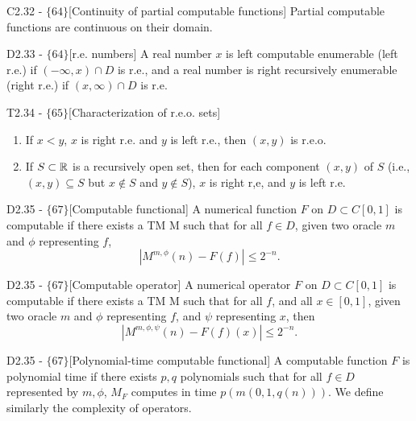 \documentclass{article}
\begin{document}
\begin{flexilemma}{C2.32 - $\{64\}$}[Continuity of partial computable functions]
    Partial computable functions are continuous on their domain.
\end{flexilemma}

\begin{flexidefinition}{D2.33 - $\{64\}$}[r.e. numbers]
    A real number $x$ is left computable enumerable (left r.e.) if $(- \infty, x) \cap D$ is r.e., and a real number is right recursively enumerable (right r.e.) if $(x,\infty) \cap D$ is r.e.
\end{flexidefinition}

\begin{flexitheorem}{T2.34 - $\{65\}$}[Characterization of r.e.o. sets]
    \begin{enumerate}[label=(\alph*)]
        \item If $x < y$, $x$ is right r.e. and $y$ is left r.e., then $(x,y)$ is r.e.o.
        \item If $S \subset \mathbb{R}$ is a recursively open set, then for each component $(x,y)$ of $S$ (i.e., $(x,y) \subseteq S$ but $x \notin S$ and $y \notin S$), $x$ is right r,e, and $y$ is left r.e.
    \end{enumerate}
\end{flexitheorem}

\begin{flexidefinition}{D2.35 - $\{67\}$}[Computable functional]
    A numerical function $F$ on $ D \subset C[0,1]$ is computable if there exists a TM M such that for all $f \in D$, given two oracle $m$ and $\phi$ representing $f$,
    \begin{equation}
        |M^{m,\phi}(n) - F(f)| \leq 2^{-n}.
    \end{equation}
\end{flexidefinition}

\begin{flexidefinition}{D2.35 - $\{67\}$}[Computable operator]
    A numerical operator $F$ on $ D \subset C[0,1]$ is computable if there exists a TM M such that for all $f$, and all $x \in [0,1]$, given two oracle $m$ and $\phi$ representing $f$, and $\psi$ representing $x$, then
    \begin{equation}
        |M^{m,\phi,\psi}(n) - F(f)(x)| \leq 2^{-n}.
    \end{equation}
\end{flexidefinition}

\begin{flexidefinition}{D2.35 - $\{67\}$}[Polynomial-time computable functional]
    A computable function $F$ is polynomial time if there exists $p,q$ polynomials such that for all $f \in D$ represented by $m,\phi$, $M_F$ computes in time $p(m(0,1,q(n)))$. We define similarly the complexity of operators.
\end{flexidefinition}
\end{document}
